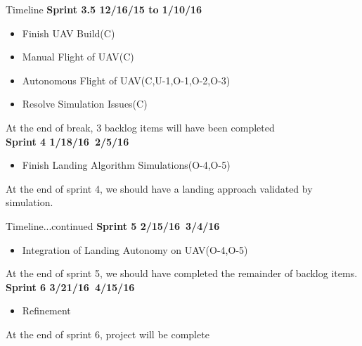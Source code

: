 \documentclass[11pt]{beamer}
\begin{document}
\begin{frame}{Timeline}
\textbf{Sprint 3.5 12/16/15 to 1/10/16}
\begin{itemize}
\item Finish UAV Build(C)
\item Manual Flight of UAV(C)
\item Autonomous Flight of UAV(C,U-1,O-1,O-2,O-3)
\item Resolve Simulation Issues(C)
\end{itemize}
\vspace{2mm}
At the end of break, 3 backlog items will have been completed\\
\vspace{4mm}
\textbf{Sprint 4 1/18/16~2/5/16}
\begin{itemize}
\item Finish Landing Algorithm Simulations(O-4,O-5)
\end{itemize}
\vspace{2mm}
At the end of sprint 4, we should have a landing approach validated by simulation.
\end{frame}


\begin{frame}{Timeline...continued}
\textbf{Sprint 5 2/15/16~3/4/16}
\begin{itemize}
\item Integration of Landing Autonomy on UAV(O-4,O-5)
\end{itemize}
\vspace{2mm}
At the end of sprint 5, we should have completed the remainder of backlog items.\\
\vspace{4mm}
\textbf{Sprint 6 3/21/16~4/15/16}
\begin{itemize}
\item Refinement
\end{itemize}
\vspace{2mm}
At the end of sprint 6, project will be complete
\end{frame}
\end{document}
